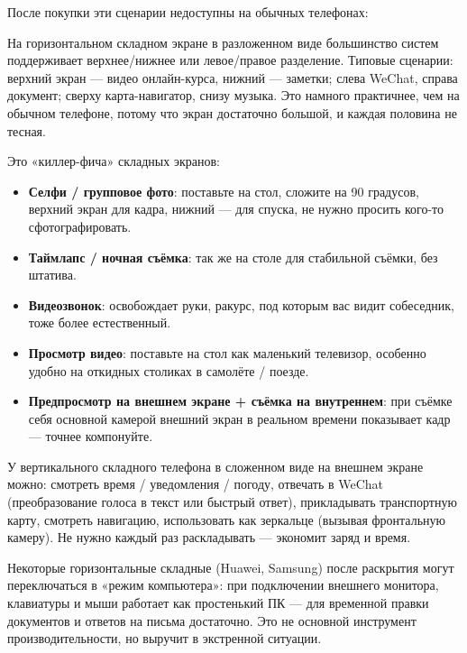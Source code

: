 
После покупки эти сценарии недоступны на обычных телефонах:


На горизонтальном складном экране в разложенном виде большинство систем поддерживает верхнее/нижнее или левое/правое разделение. Типовые сценарии: верхний экран — видео онлайн-курса, нижний — заметки; слева WeChat, справа документ; сверху карта-навигатор, снизу музыка. Это намного практичнее, чем на обычном телефоне, потому что экран достаточно большой, и каждая половина не тесная.


Это «киллер-фича» складных экранов:

\begin{itemize}
  \item \textbf{Селфи / групповое фото}: поставьте на стол, сложите на 90 градусов, верхний экран для кадра, нижний — для спуска, не нужно просить кого-то сфотографировать.
  \item \textbf{Таймлапс / ночная съёмка}: так же на столе для стабильной съёмки, без штатива.
  \item \textbf{Видеозвонок}: освобождает руки, ракурс, под которым вас видит собеседник, тоже более естественный.
  \item \textbf{Просмотр видео}: поставьте на стол как маленький телевизор, особенно удобно на откидных столиках в самолёте / поезде.
  \item \textbf{Предпросмотр на внешнем экране + съёмка на внутреннем}: при съёмке себя основной камерой внешний экран в реальном времени показывает кадр — точнее компонуйте.
\end{itemize}


У вертикального складного телефона в сложенном виде на внешнем экране можно: смотреть время / уведомления / погоду, отвечать в WeChat (преобразование голоса в текст или быстрый ответ), прикладывать транспортную карту, смотреть навигацию, использовать как зеркальце (вызывая фронтальную камеру). Не нужно каждый раз раскладывать — экономит заряд и время.


Некоторые горизонтальные складные (Huawei, Samsung) после раскрытия могут переключаться в «режим компьютера»: при подключении внешнего монитора, клавиатуры и мыши работает как простенький ПК — для временной правки документов и ответов на письма достаточно. Это не основной инструмент производительности, но выручит в экстренной ситуации.

